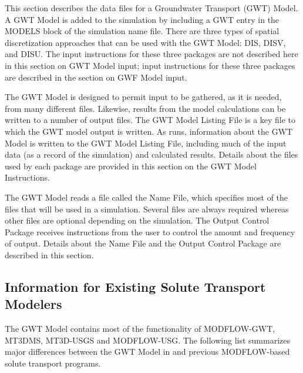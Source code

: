 This section describes the data files for a \mf Groundwater Transport (GWT) Model.  A GWT Model is added to the simulation by including a GWT entry in the MODELS block of the simulation name file.  There are three types of spatial discretization approaches that can be used with the GWT Model: DIS, DISV, and DISU.  The input instructions for these three packages are not described here in this section on GWT Model input; input instructions for these three packages are described in the section on GWF Model input.

The GWT Model is designed to permit input to be gathered, as it is needed, from many different files.  Likewise, results from the model calculations can be written to a number of output files. The GWT Model Listing File is a key file to which the GWT model output is written.  As \mf runs, information about the GWT Model is written to the GWT Model Listing File, including much of the input data (as a record of the simulation) and calculated results.  Details about the files used by each package are provided in this section on the GWT Model Instructions.

The GWT Model reads a file called the Name File, which specifies most of the files that will be used in a simulation. Several files are always required whereas other files are optional depending on the simulation. The Output Control Package receives instructions from the user to control the amount and frequency of output.  Details about the Name File and the Output Control Package are described in this section.

\subsection{Information for Existing Solute Transport Modelers}
The \mf GWT Model contains most of the functionality of MODFLOW-GWT, MT3DMS, MT3D-USGS and MODFLOW-USG.  The following list summarizes major differences between the GWT Model in \mf and previous MODFLOW-based solute transport programs.

